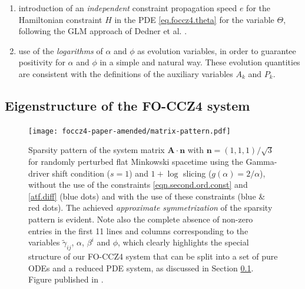 \begin{enumerate}
 \item introduction of an \textit{independent} constraint propagation
   speed $e$ for the Hamiltonian constraint $H$ in the PDE
   \eqref{eq.foccz4.theta} for the variable $\Theta$, following
   the GLM approach of Dedner et al. \cite{Dedner:2002}.

 \item use of the \textit{logarithms} of $\alpha$ and $\phi$ as evolution
   variables, in order to guarantee positivity for $\alpha$ and $\phi$ in
   a simple and natural way. These evolution quantities are consistent
   with the definitions of the auxiliary variables $A_k$ and $P_k$.
\end{enumerate}


\subsection{Eigenstructure of the FO-CCZ4 system}
\label{sec.hyp}
%
\begin{figure}[t]
	\texttt{[image: foccz4-paper-amended/matrix-pattern.pdf]}
	\caption[
	    FO-CCZ4 system sparsity pattern, 
	]{Sparsity pattern of the system matrix $\boldsymbol{A} \cdot
		\boldsymbol{n}$ with $\boldsymbol{n}=(1,1,1) / \sqrt{3}$ for
		randomly perturbed flat Minkowski spacetime using the Gamma-driver
		shift condition ($s=1$) and $1+\log$ slicing
		($g(\alpha)=2/\alpha$), without the use of the constraints
		\protect\eqref{eqn.second.ord.const} and \protect\eqref{atf.diff} (blue 
		dots) and
		with the use of these constraints (blue \& red dots). The achieved
		\textit{approximate symmetrization} of the sparsity pattern is
		evident. Note also the complete absence of non-zero entries in the
		first 11 lines and columns corresponding to the variables
		$\tilde{\gamma}_{ij}$, $\alpha$, $\beta^i$ and $\phi$, which clearly
		highlights the special structure of our FO-CCZ4 system that can be
		split into a set of pure ODEs and a reduced PDE system, as
		discussed in Section \protect\ref{sec.hyp}.
		Figure published in \cite{Dumbser2017}.}
	\label{fig:foccz4-sparsity}
\end{figure}


